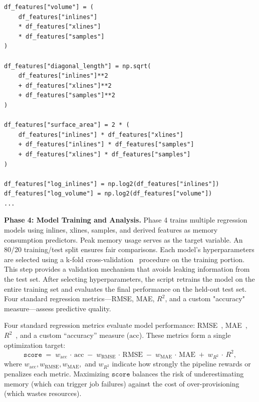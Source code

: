 \begin{lstlisting}[style=pythonstyle,
    caption={Feature extraction excerpt from \texttt{collect\_results.py}. Additional derived metrics capture polynomial or ratio-based growth.},
    label={lst:results_py}
]
df_features["volume"] = (
    df_features["inlines"]
    * df_features["xlines"]
    * df_features["samples"]
)

df_features["diagonal_length"] = np.sqrt(
    df_features["inlines"]**2
    + df_features["xlines"]**2
    + df_features["samples"]**2
)

df_features["surface_area"] = 2 * (
    df_features["inlines"] * df_features["xlines"]
    + df_features["inlines"] * df_features["samples"]
    + df_features["xlines"] * df_features["samples"]
)

df_features["log_inlines"] = np.log2(df_features["inlines"])
df_features["log_volume"] = np.log2(df_features["volume"])
...
\end{lstlisting}

\vspace{1em}
\noindent
\textbf{Phase 4: Model Training and Analysis.}
Phase 4 trains multiple regression models using inlines, xlines, samples, and derived features as memory consumption predictors.
Peak memory usage serves as the target variable.
An 80/20 training/test split ensures fair comparisons.
Each model's hyperparameters are selected using a k-fold cross-validation~\cite{kohavi1995study} procedure on the training portion.
This step provides a validation mechanism that avoids leaking information from the test set.
After selecting hyperparameters, the script retrains the model on the entire training set and evaluates the final performance on the held-out test set.
Four standard regression metrics—\ac{RMSE}, \ac{MAE}, \(R^2\), and a custom "accuracy" measure—assess predictive quality.

Four standard regression metrics evaluate model performance:
\ac{RMSE}~\cite{hyndman2006},
\ac{MAE}~\cite{willmott2005mae},
\(R^2\)~\cite{draper1998applied},
and a custom “accuracy” measure ($\mathrm{acc}$).
These metrics form a single optimization target:
\[
    \texttt{score} \;=\;
    w_\mathrm{acc}\,\cdot\,\mathrm{acc}
    \;-\;
    w_\mathrm{RMSE}\,\cdot\,\mathrm{RMSE}
    \;-\;
    w_\mathrm{MAE}\,\cdot\,\mathrm{MAE}
    \;+\;
    w_{R^2}\,\cdot\,R^2,
\]
where \(w_\mathrm{acc}, w_\mathrm{RMSE}, w_\mathrm{MAE},\) and \(w_{R^2}\) indicate how strongly the pipeline rewards or penalizes each metric.
Maximizing \(\texttt{score}\) balances the risk of underestimating memory (which can trigger job failures) against the cost of over-provisioning (which wastes resources).

